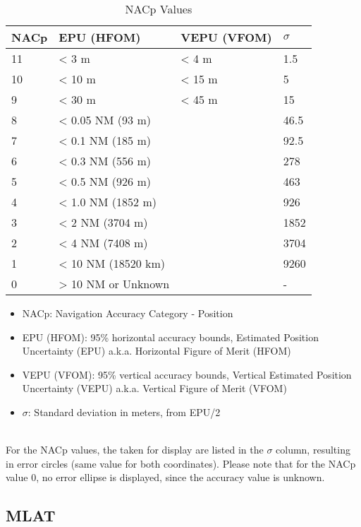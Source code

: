 \begin{table}[H]
  \center
  \begin{tabular}{ | l | l | l | l |}
    \hline
    \textbf{NACp} & \textbf{EPU (HFOM)} & \textbf{VEPU (VFOM)} & \textbf{$\sigma$} \\ \hline
    11  & < 3 m              & < 4 m  & 1.5 \\ \hline
    10  & < 10 m             & < 15 m & 5 \\ \hline
    9   & < 30 m             & < 45 m & 15 \\ \hline
    8   & < 0.05 NM (93 m)   & & 46.5 \\ \hline
    7   & < 0.1 NM (185 m)   & & 92.5 \\ \hline
    6   & < 0.3 NM (556 m)   & & 278 \\ \hline
    5   & < 0.5 NM (926 m)   & & 463 \\ \hline
    4   & < 1.0 NM (1852 m)  & & 926 \\ \hline
    3   & < 2 NM (3704 m)    & & 1852 \\ \hline
    2   & < 4 NM (7408 m)    & & 3704 \\ \hline
    1   & < 10 NM (18520 km) & & 9260 \\ \hline
    0   & > 10 NM or Unknown & & - \\ \hline
  \end{tabular}
  \caption{NACp Values}
\end{table}

\begin{itemize}
\item NACp: Navigation Accuracy Category - Position
\item EPU (HFOM): 95\% horizontal accuracy bounds, Estimated Position Uncertainty (EPU) a.k.a. Horizontal Figure of Merit (HFOM)
\item VEPU (VFOM): 95\% vertical accuracy bounds, Vertical Estimated Position Uncertainty (VEPU) a.k.a. Vertical Figure of Merit (VFOM)
\item $\sigma$: Standard deviation in meters, from EPU/2
\end{itemize}
\ \\

For the NACp values, the taken for display are listed in the $\sigma$ column, resulting in error circles (same value for both coordinates). Please note that for the NACp value 0, no error ellipse is displayed, since the accuracy value is unknown.

\subsection{MLAT}

